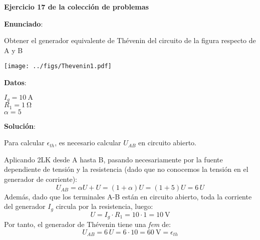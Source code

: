 \documentclass[10pt]{article}
\begin{document}
\large{\textbf{Ejercicio 17 de la colección de problemas}}

\vspace{3mm}
\large{\textbf{Enunciado}}:

\vspace{5mm}

Obtener el generador equivalente de Thévenin del circuito de la figura respecto de A y B

\vspace{3mm}

\begin{minipage}[c]{0.5\linewidth}
    \begin{center}
        \texttt{[image: ../figs/Thevenin1.pdf]}
    \end{center}
\end{minipage}
\begin{minipage}[c]{0.5\linewidth}
    \textbf{Datos}:
    \vspace{2mm}
    
    $I_g = \qty{10}{\ampere}$\\[5pt]
    $R_1 = \qty{1}{\ohm}$\\[5pt]
    $\alpha = 5$
\end{minipage}


\vspace{3mm}

\hrulefill

\vspace{5mm}
\textbf{Solución}:
\vspace{4mm}

Para calcular $\epsilon_{th}$, es necesario calcular $U_{AB}$ en circuito abierto. 

Aplicando 2LK desde A hasta B, pasando necesariamente por la fuente dependiente de tensión y la resistencia (dado que no conocemos la tensión en el generador de corriente):
\begin{equation*}
  U_{AB} = \alpha U + U = (1 + \alpha) U=(1+5)U=6\,U
\end{equation*}
Además, dado que los terminales A-B están en circuito abierto, toda la corriente del generador $I_g$ circula por la resistencia, luego:
\begin{equation*}
  U = I_g \cdot R_1=10\cdot 1 = \qty{10}{\volt}
\end{equation*}
Por tanto, el generador de Thévenin tiene una \textit{fem} de:
\begin{equation*}
  U_{AB} = 6\, U = 6\cdot 10 = \boxed{\qty{60}{\volt} = \epsilon_{th}}
\end{equation*}
\end{document}

